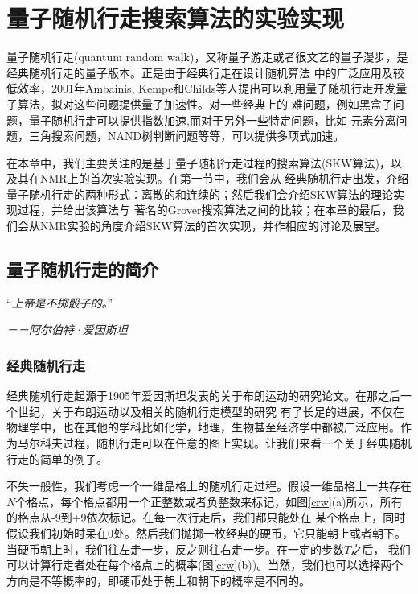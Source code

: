 ﻿
\chapter{量子随机行走搜索算法的实验实现}



量子随机行走(quantum random walk)，又称量子游走或者很文艺的量子漫步，是经典随机行走的量子版本。正是由于经典行走在设计随机算法
中的广泛应用及较低效率，2001年Ambainis, Kempe和Childs等人提出可以利用量子随机行走开发量子算法，拟对这些问题提供量子加速性\cite{rwview1,rwview2,rwview3}。对一些经典上的
难问题，例如黑盒子问题，量子随机行走可以提供指数加速\cite{rwview4,rwview5},而对于另外一些特定问题，比如
元素分离问题\cite{rwview6}，三角搜索问题\cite{rwview7}，NAND树判断问题\cite{rwview8}等等，可以提供多项式加速。

在本章中，我们主要关注的是基于量子随机行走过程的搜索算法(SKW算法)\cite{skw}，以及其在NMR上的首次实验实现\cite{rw1}。在第一节中，我们会从
经典随机行走出发，介绍量子随机行走的两种形式：离散的和连续的；然后我们会介绍SKW算法的理论实现过程，并给出该算法与
著名的Grover搜索算法\cite{grover}之间的比较；在本章的最后，我们会从NMR实验的角度介绍SKW算法的首次实现，并作相应的讨论及展望。

\section{量子随机行走的简介}

“\emph{上帝是不掷骰子的。}”

 \hspace{19em} \emph{－－阿尔伯特·爱因斯坦}

\subsection{经典随机行走}

经典随机行走起源于1905年爱因斯坦发表的关于布朗运动的研究论文\cite{crw}。在那之后一个世纪，关于布朗运动以及相关的随机行走模型的研究
有了长足的进展，不仅在物理学中，也在其他的学科比如化学，地理，生物甚至经济学中都被广泛应用。作为马尔科夫过程，随机行走可以在任意的图上实现。让我们来看一个关于经典随机行走的简单的例子。

不失一般性，我们考虑一个一维晶格上的随机行走过程。假设一维晶格上一共存在$N$个格点，每个格点都用一个正整数或者负整数来标记，如图\ref{crw}(a)所示，所有的格点从-9到+9依次标记。在每一次行走后，我们都只能处在
某个格点上，同时假设我们初始时呆在0处。然后我们抛掷一枚经典的硬币，它只能朝上或者朝下。当硬币朝上时，我们往左走一步，反之则往右走一步。在一定的步数$T$之后，
我们可以计算行走者处在每个格点上的概率(图\ref{crw}(b))。当然，我们也可以选择两个方向是不等概率的，即硬币处于朝上和朝下的概率是不同的。

